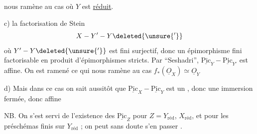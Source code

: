  nous ramène au cas où $Y$ est \uline{réduit}.

c)  la factorisation de Stein
\[
X-Y'-Y\deleted{\unsure{'}}
\]
où $Y'-Y\deleted{\unsure{'}}$ est fini surjectif, donc un épimorphisme fini factorisable en produit d'épimorphismes stricts. Par ``Seshadri'', $\underline{\mathrm{Pic}}_{Y}-\underline{\mathrm{Pic}}_{Y'}$ est affine. On est ramené  ce qui nous ramène au cas $f_{*}(\underline O_X)\simeq \underline O_Y$

d) Mais dans ce cas on sait aussitôt que $\underline{\mathrm{Pic}}_X-\underline{\mathrm{Pic}}_Y$ est un , donc  une immersion fermée, donc affine


NB. On s'est servi de l'existence des $\underline{\mathrm{Pic}}_Z$ pour $Z=Y_{\mathrm{réd}}$, $X_{\mathrm{réd}}$, et pour les préschémas finis sur $Y_{\mathrm{réd}}$ ;  on peut sans doute s'en passer \unsure{\textemdash]|(?)\textnormal{]}}.

